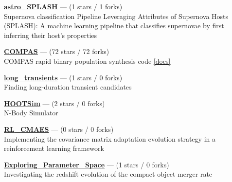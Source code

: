 \item \href{https://github.com/Adam-Boesky/astro_SPLASH}{{\bf astro{\_}SPLASH}} --- (1 stars / 1 forks) \\
Supernova classification Pipeline Leveraging Attributes of Supernova Hosts (SPLASH): A machine learning pipeline that classifies supernovae by first inferring their host's properties 

\item \href{https://github.com/TeamCOMPAS/COMPAS}{{\bf COMPAS}} --- (72 stars / 72 forks) \\
COMPAS rapid binary population synthesis code \href{http://compas.science}{[docs]}

\item \href{https://github.com/Adam-Boesky/long_transients}{{\bf long{\_}transients}} --- (1 stars / 0 forks) \\
Finding long-duration transient candidates 

\item \href{https://github.com/jdinovi/HOOTSim}{{\bf HOOTSim}} --- (2 stars / 0 forks) \\
N-Body Simulator 

\item \href{https://github.com/Adam-Boesky/RL_CMAES}{{\bf RL{\_}CMAES}} --- (0 stars / 0 forks) \\
Implementing the covariance matrix adaptation evolution strategy in a reinforcement learning framework 

\item \href{https://github.com/Adam-Boesky/Exploring_Parameter_Space}{{\bf Exploring{\_}Parameter{\_}Space}} --- (1 stars / 0 forks) \\
Investigating the redshift evolution of the compact object merger rate 